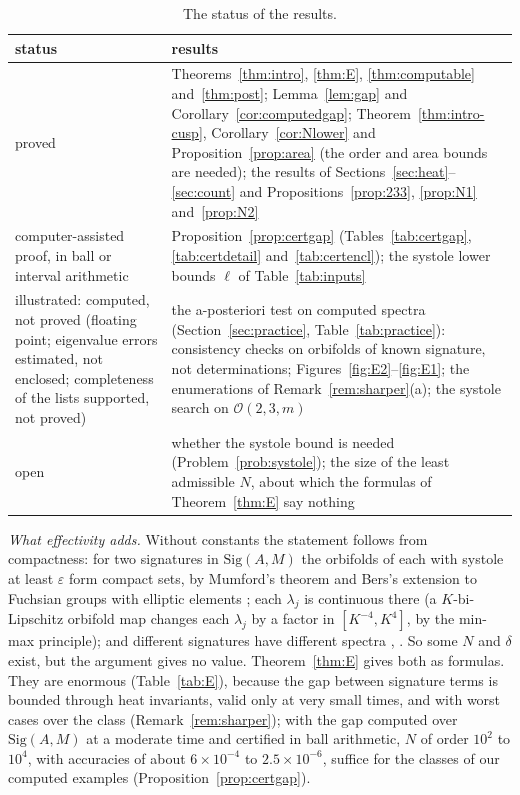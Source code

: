 \documentclass[pdflatex,sn-mathphys-num]{sn-jnl}
\theoremstyle{thmstyleone}%
\theoremstyle{thmstylethree}%
\newcommand{\Orb}{\mathcal{O}}
\newcommand{\Sig}{\mathrm{Sig}}
\begin{document}
\begin{table}[h]
\centering\footnotesize
\caption{The status of the results.}\label{tab:status}
\begin{tabular}{@{}>{\raggedright\arraybackslash}p{32mm}>{\raggedright\arraybackslash}p{85mm}@{}}
\toprule
status & results\\
\midrule
proved & Theorems~\ref{thm:intro}, \ref{thm:E}, \ref{thm:computable} and~\ref{thm:post}; Lemma~\ref{lem:gap} and Corollary~\ref{cor:computedgap}; Theorem~\ref{thm:intro-cusp}, Corollary~\ref{cor:Nlower} and Proposition~\ref{prop:area} (the order and area bounds are needed); the results of Sections~\ref{sec:heat}--\ref{sec:count} and Propositions~\ref{prop:233}, \ref{prop:N1} and~\ref{prop:N2}\\
computer-assisted proof, in ball or interval arithmetic & Proposition~\ref{prop:certgap} (Tables~\ref{tab:certgap}, \ref{tab:certdetail} and~\ref{tab:certencl}); the systole lower bounds $\ell$ of Table~\ref{tab:inputs}\\
illustrated: computed, not proved (floating point; eigenvalue errors estimated, not enclosed; completeness of the lists supported, not proved) & the a-posteriori test on computed spectra (Section~\ref{sec:practice}, Table~\ref{tab:practice}): consistency checks on orbifolds of known signature, not determinations; Figures~\ref{fig:E2}--\ref{fig:E1}; the enumerations of Remark~\ref{rem:sharper}(a); the systole search on $\Orb(2,3,m)$\\
open & whether the systole bound is needed (Problem~\ref{prob:systole}); the size of the least admissible $N$, about which the formulas of Theorem~\ref{thm:E} say nothing\\
\bottomrule
\end{tabular}
\end{table}

\emph{What effectivity adds.} Without constants the statement follows from compactness: for two signatures in $\Sig(A,M)$ the orbifolds of each with systole at least $\varepsilon$ form compact sets, by Mumford's theorem \cite[Cor.~3]{mumford1971} and Bers's extension to Fuchsian groups with elliptic elements \cite{bers1972}; each $\lambda_j$ is continuous there (a $K$-bi-Lipschitz orbifold map changes each $\lambda_j$ by a factor in $[K^{-4},K^4]$, by the min-max principle); and different signatures have different spectra \cite{drydenstrohmaier2009}, \cite[Thm~1]{doylerossetti2011}. So some $N$ and $\delta$ exist, but the argument gives no value. Theorem~\ref{thm:E} gives both as formulas. They are enormous (Table~\ref{tab:E}), because the gap between signature terms is bounded through heat invariants, valid only at very small times, and with worst cases over the class (Remark~\ref{rem:sharper}); with the gap computed over $\Sig(A,M)$ at a moderate time and certified in ball arithmetic, $N$ of order $10^2$ to $10^4$, with accuracies of about $6\times10^{-4}$ to $2.5\times10^{-6}$, suffice for the classes of our computed examples (Proposition~\ref{prop:certgap}).
\end{document}

